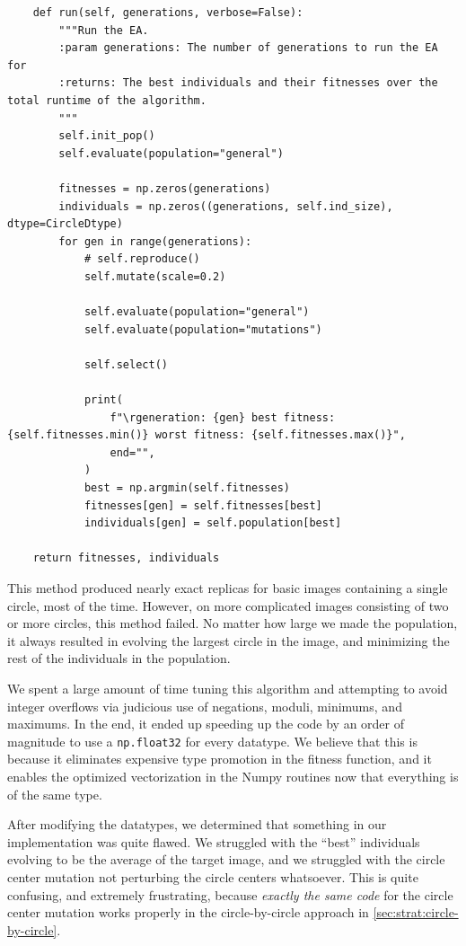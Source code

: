 \documentclass{article}
\begin{document}
\begin{verbatim}
    def run(self, generations, verbose=False):
        """Run the EA.
        :param generations: The number of generations to run the EA for
        :returns: The best individuals and their fitnesses over the total runtime of the algorithm.
        """
        self.init_pop()
        self.evaluate(population="general")

        fitnesses = np.zeros(generations)
        individuals = np.zeros((generations, self.ind_size), dtype=CircleDtype)
        for gen in range(generations):
            # self.reproduce()
            self.mutate(scale=0.2)

            self.evaluate(population="general")
            self.evaluate(population="mutations")

            self.select()

            print(
                f"\rgeneration: {gen} best fitness: {self.fitnesses.min()} worst fitness: {self.fitnesses.max()}",
                end="",
            )
            best = np.argmin(self.fitnesses)
            fitnesses[gen] = self.fitnesses[best]
            individuals[gen] = self.population[best]

    return fitnesses, individuals
\end{verbatim}

This method produced nearly exact replicas for basic images containing a single circle, most of the
time. However, on more complicated images consisting of two or more circles, this method failed. No
matter how large we made the population, it always resulted in evolving the largest circle in the
image, and minimizing the rest of the individuals in the population.

We spent a large amount of time tuning this algorithm and attempting to avoid integer overflows via
judicious use of negations, moduli, minimums, and maximums. In the end, it ended up speeding up the
code by an order of magnitude to use a \texttt{np.float32} for every datatype. We
believe that this is because it eliminates expensive type promotion in the fitness function, and it
enables the optimized vectorization in the Numpy routines now that everything is of the same type.

After modifying the datatypes, we determined that something in our implementation was quite flawed.
We struggled with the ``best'' individuals evolving to be the average of the target image, and we
struggled with the circle center mutation not perturbing the circle centers whatsoever. This is
quite confusing, and extremely frustrating, because \textit{exactly the same code} for the circle
center mutation works properly in the circle-by-circle approach in
\autoref{sec:strat:circle-by-circle}.
\end{document}
